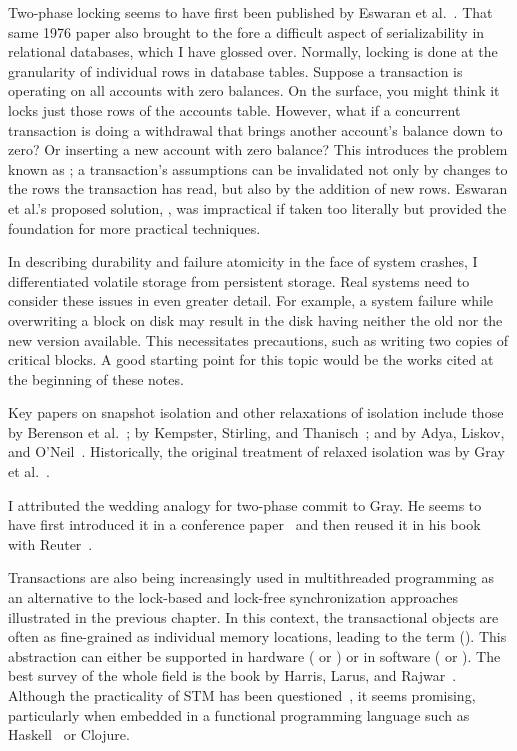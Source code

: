 Two-phase locking seems to have first been published by
Eswaran et
al.~\cite{max1005}.  That same 1976 paper also brought to the fore a
difficult aspect of serializability in relational databases, which I
have glossed over.  Normally, locking is done at the granularity of
individual rows in database tables.  Suppose a transaction is
operating on all accounts with zero balances.  On the surface, you
might think it locks just those rows of the accounts table.  However, what
if a concurrent transaction is doing a withdrawal that brings another
account's balance down to zero?  Or inserting a new account with zero
balance?  This introduces the problem known as ; a
transaction's assumptions can be invalidated not only by changes to
the rows the transaction has read, but also by the addition of new
rows.
Eswaran et al.'s proposed solution,
, was impractical if taken too literally
but provided the foundation for more practical techniques.

In describing durability and failure atomicity in the face of system
crashes, I differentiated volatile storage from persistent storage.
Real systems need to consider these issues in even greater detail.
For example, a system failure while overwriting a block on disk may
result in the disk having neither the old nor the new version
available.  This necessitates precautions, such as
writing two copies of critical blocks.  A good starting point
for this topic would be the works cited at the beginning of these
notes.

Key papers on snapshot isolation and other relaxations of isolation
include those by Berenson et
al.~\cite{max1022}; by Kempster,
Stirling, and Thanisch~\cite{max1023}; and by Adya,
Liskov, and
O'Neil~\cite{max1021}. Historically, the
original treatment of relaxed isolation was by Gray
et al.~\cite{max1059}.

I attributed the wedding analogy for two-phase commit to Gray.  He seems to have first introduced it in a conference
paper~\cite{max1051} and then reused it in his book with
Reuter~\cite{max1009}.

Transactions are also being increasingly used in multithreaded
programming as an alternative to the lock-based and lock-free
synchronization approaches illustrated in the previous chapter.  In
this context, the transactional objects are often as fine-grained as
individual memory locations, leading to the term  ().
This abstraction can either be supported in hardware ( or )
or in software ( or ). The best survey of
the whole field is the book by Harris, Larus, and Rajwar~\cite{max1204}.
Although the practicality of STM has been questioned~\cite{max1206,max1207}, it seems promising, particularly when
embedded in a functional programming language such as Haskell~\cite{max1205} or Clojure.
